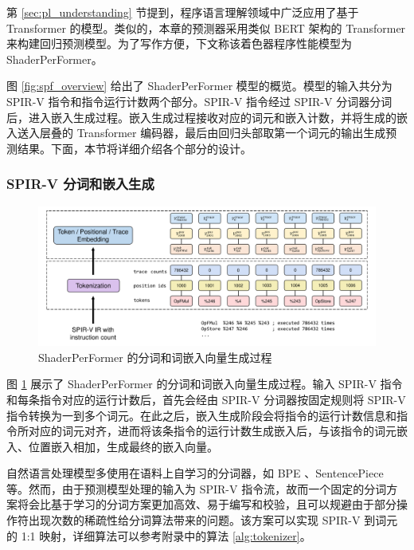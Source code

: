 第 \ref{sec:pl_understanding} 节提到，程序语言理解领域中广泛应用了基于 Transformer 的模型。类似的，{\amend 本章的}预测器采用类似 BERT\cite{devlin-etal-2019-bert} 架构的 Transformer 来构建回归预测模型。{\amend 为了写作方便，}下文称该着色器程序性能模型为 ShaderPerFormer。

图 \ref{fig:spf_overview} 给出了 ShaderPerFormer 模型的概览。{\amend 模型的输入共分为 SPIR-V 指令和指令运行计数两个部分。SPIR-V 指令经过 SPIR-V 分词器分词后，进入嵌入生成过程。嵌入生成过程接收对应的词元和嵌入计数，并将生成的嵌入送入层叠的 Transformer 编码器，最后由回归头部取第一个词元的输出生成预测结果。下面，本节将详细介绍各个部分的设计。}

\subsubsection{SPIR-V 分词和嵌入生成}

\begin{figure}[h]
    \centering
    \includegraphics[width=1\linewidth]{figures/tokandembed.pdf}
    \caption{ShaderPerFormer 的分词和词嵌入向量生成过程}
    \label{fig:spf_embedding}
\end{figure}

图 \ref{fig:spf_embedding} 展示了 ShaderPerFormer 的分词和词嵌入向量生成过程。{\amend 输入 SPIR-V 指令和每条指令对应的运行计数后，首先会经由 SPIR-V 分词器按固定规则将 SPIR-V 指令转换为一到多个词元。在此之后，嵌入生成阶段会将指令的运行计数信息和指令所对应的词元对齐，进而将该条指令的运行计数生成嵌入后，与该指令的词元嵌入、位置嵌入相加，生成最终的嵌入向量。}

{} 自然语言处理模型多使用在语料上自学习的分词器，如 BPE \cite{sennrich-etal-2016-neural}、SentencePiece \cite{kudo-richardson-2018-sentencepiece} 等。然而，由于预测模型处理的输入为 SPIR-V 指令流，故而一个{\amend 固定的分词方案}将会比基于学习的分词方案更加高效、易于编写和校验，且可以规避由于部分操作符出现次数的稀疏性给分词算法带来的问题。该方案可以实现 SPIR-V 到词元的 1:1 映射，详细算法可以参考附录中的算法 \ref{alg:tokenizer}。

